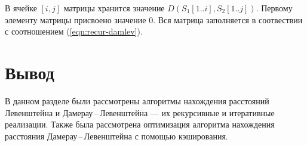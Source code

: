 В ячейке $[i, j]$ матрицы хранится значение $D(S_1[1..i], S_2[1..j])$. Пер\-вому элементу матрицы присвоено значение $0$. Вся матрица заполняется в соотвествии с соотношением (\ref{eqn:recur-damlev}).

\section*{Вывод}

В данном разделе были рассмотрены алгоритмы нахождения расстояний Левенштейна и Дамерау\,--\,Левенштейна --- их рекурсивные и итеративные реализации. Также была рассмотрена оптимизация алгоритма нахождения расстояния Дамерау\,--\,Левенштейна с помощью кэширования.